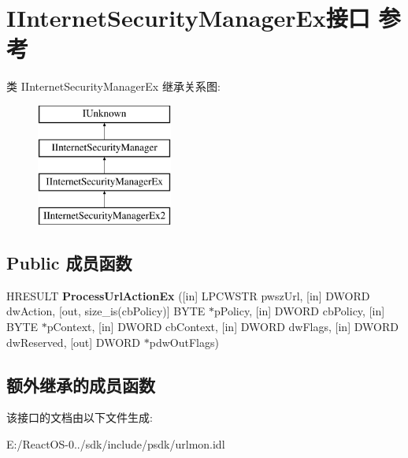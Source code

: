 \hypertarget{interface_i_internet_security_manager_ex}{}\section{I\+Internet\+Security\+Manager\+Ex接口 参考}
\label{interface_i_internet_security_manager_ex}
类 I\+Internet\+Security\+Manager\+Ex 继承关系图\+:\begin{figure}[H]
\begin{center}
\leavevmode
\includegraphics[height=4.000000cm]{interface_i_internet_security_manager_ex}
\end{center}
\end{figure}
\subsection*{Public 成员函数}
\begin{DoxyCompactItemize}
\item 
\mbox{\label{interface_i_internet_security_manager_ex_a9d4508a7823a905531ce243545e2288c}} 
H\+R\+E\+S\+U\+LT {\bfseries Process\+Url\+Action\+Ex} (\mbox{[}in\mbox{]} L\+P\+C\+W\+S\+TR pwsz\+Url, \mbox{[}in\mbox{]} D\+W\+O\+RD dw\+Action, \mbox{[}out, size\+\_\+is(cb\+Policy)\mbox{]} B\+Y\+TE $\ast$p\+Policy, \mbox{[}in\mbox{]} D\+W\+O\+RD cb\+Policy, \mbox{[}in\mbox{]} B\+Y\+TE $\ast$p\+Context, \mbox{[}in\mbox{]} D\+W\+O\+RD cb\+Context, \mbox{[}in\mbox{]} D\+W\+O\+RD dw\+Flags, \mbox{[}in\mbox{]} D\+W\+O\+RD dw\+Reserved, \mbox{[}out\mbox{]} D\+W\+O\+RD $\ast$pdw\+Out\+Flags)
\end{DoxyCompactItemize}
\subsection*{额外继承的成员函数}


该接口的文档由以下文件生成\+:\begin{DoxyCompactItemize}
\item 
E\+:/\+React\+O\+S-\/0../sdk/include/psdk/urlmon.\+idl\end{DoxyCompactItemize}
